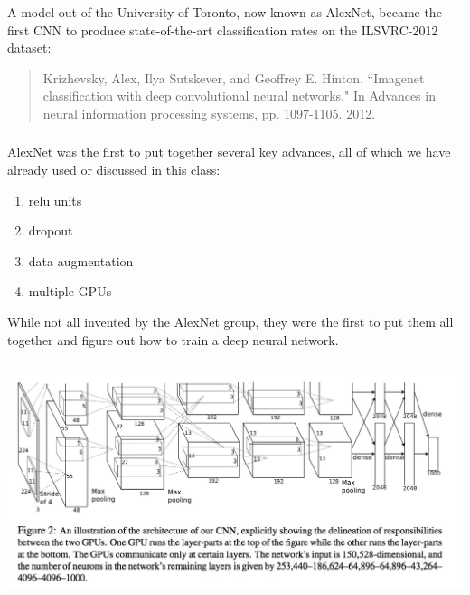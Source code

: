 \documentclass[xetex,mathserif,serif,aspectratio=169]{beamer}
\begin{document}
\begin{frame}[fragile] \frametitle{} \oldB \small


A model out of the University of Toronto, now known as AlexNet,
became the first CNN to produce state-of-the-art classification
rates on the ILSVRC-2012 dataset:
\begin{quote}
Krizhevsky, Alex, Ilya Sutskever, and Geoffrey E. Hinton. ``Imagenet classification with deep convolutional neural networks." In Advances in neural information processing systems, pp. 1097-1105. 2012.
\end{quote}

\end{frame}

\begin{frame}[fragile] \frametitle{} \oldB \small


AlexNet was the first to put together several key advances, all
of which we have already used or discussed in this class:
\begin{enumerate}
\item relu units
\item dropout
\item data augmentation
\item multiple GPUs
\end{enumerate}
While not all invented by the AlexNet group, they were the first
to put them all together and figure out how to train a deep
neural network.

\end{frame}

\begin{frame}[fragile] \frametitle{} \oldB \small

\begin{center}
\includegraphics[width=\textwidth]{img/alexNet.jpg}
\end{center}

\end{frame}
\end{document}
